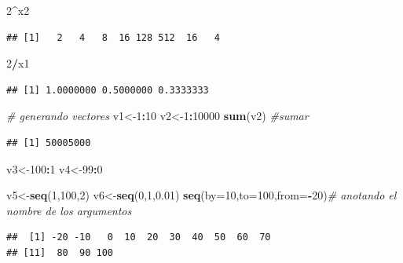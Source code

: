 \documentclass[
]{book}
\newenvironment{Shaded}{\begin{snugshade}}{\end{snugshade}}
\newcommand{\CommentTok}[1]{\textcolor[rgb]{0.56,0.35,0.01}{\textit{#1}}}
\newcommand{\DataTypeTok}[1]{\textcolor[rgb]{0.13,0.29,0.53}{#1}}
\newcommand{\DecValTok}[1]{\textcolor[rgb]{0.00,0.00,0.81}{#1}}
\newcommand{\FloatTok}[1]{\textcolor[rgb]{0.00,0.00,0.81}{#1}}
\newcommand{\KeywordTok}[1]{\textcolor[rgb]{0.13,0.29,0.53}{\textbf{#1}}}
\newcommand{\NormalTok}[1]{#1}
\newcommand{\OperatorTok}[1]{\textcolor[rgb]{0.81,0.36,0.00}{\textbf{#1}}}
\begin{document}
\begin{Shaded}
\begin{Highlighting}[]
\DecValTok{2}\OperatorTok{^}\NormalTok{x2}
\end{Highlighting}
\end{Shaded}

\begin{verbatim}
## [1]   2   4   8  16 128 512  16   4
\end{verbatim}

\begin{Shaded}
\begin{Highlighting}[]
\DecValTok{2}\OperatorTok{/}\NormalTok{x1}
\end{Highlighting}
\end{Shaded}

\begin{verbatim}
## [1] 1.0000000 0.5000000 0.3333333
\end{verbatim}

\begin{Shaded}
\begin{Highlighting}[]
\CommentTok{# generando vectores}
\NormalTok{v1<-}\DecValTok{1}\OperatorTok{:}\DecValTok{10}
\NormalTok{v2<-}\DecValTok{1}\OperatorTok{:}\DecValTok{10000}
\KeywordTok{sum}\NormalTok{(v2) }\CommentTok{#sumar}
\end{Highlighting}
\end{Shaded}

\begin{verbatim}
## [1] 50005000
\end{verbatim}

\begin{Shaded}
\begin{Highlighting}[]
\NormalTok{v3<-}\DecValTok{100}\OperatorTok{:}\DecValTok{1}
\NormalTok{v4<-}\DecValTok{99}\OperatorTok{:}\DecValTok{0}

\NormalTok{v5<-}\KeywordTok{seq}\NormalTok{(}\DecValTok{1}\NormalTok{,}\DecValTok{100}\NormalTok{,}\DecValTok{2}\NormalTok{)}
\NormalTok{v6<-}\KeywordTok{seq}\NormalTok{(}\DecValTok{0}\NormalTok{,}\DecValTok{1}\NormalTok{,}\FloatTok{0.01}\NormalTok{)}
\KeywordTok{seq}\NormalTok{(}\DataTypeTok{by=}\DecValTok{10}\NormalTok{,}\DataTypeTok{to=}\DecValTok{100}\NormalTok{,}\DataTypeTok{from=}\OperatorTok{-}\DecValTok{20}\NormalTok{)}\CommentTok{# anotando el nombre de los argumentos}
\end{Highlighting}
\end{Shaded}

\begin{verbatim}
##  [1] -20 -10   0  10  20  30  40  50  60  70
## [11]  80  90 100
\end{verbatim}
\end{document}
